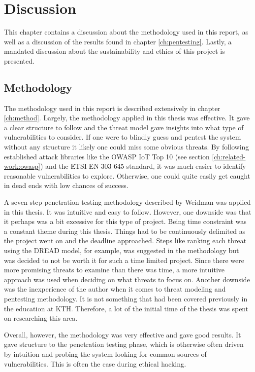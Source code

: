 \chapter{Discussion} \label{ch:discussion}
This chapter contains a discussion about the methodology used in this report, as well as a discussion of the results found in chapter \ref{ch:pentesting}. Lastly, a mandated discussion about the sustainability and ethics of this project is presented.

\section{Methodology}
The methodology used in this report is described extensively in chapter \ref{ch:method}. Largely, the methodology applied in this thesis was effective. It gave a clear structure to follow and the threat model gave insights into what type of vulnerabilities to consider. If one were to blindly guess and pentest the system without any structure it likely one could miss some obvious threats. By following established attack libraries like the OWASP IoT Top 10 \cite{owasp-iot-top10} (see section \ref{ch:related-work:owasp}) and the ETSI EN 303 645 standard, it was much easier to identify reasonable vulnerabilities to explore. Otherwise, one could quite easily get caught in dead ends with low chances of success.

A seven step penetration testing methodology described by Weidman \cite{weidman2014} was applied in this thesis. It was intuitive and easy to follow. However, one downside was that it perhaps was a bit excessive for this type of project. Being time constraint was a constant theme during this thesis. Things had to be continuously delimited as the project went on and the deadline approached. Steps like ranking each threat using the DREAD model, for example, was suggested in the methodology but was decided to not be worth it for such a time limited project. Since there were more promising threats to examine than there was time, a more intuitive approach was used when deciding on what threats to focus on. Another downside was the inexperience of the author when it comes to threat modeling and pentesting methodology. It is not something that had been covered previously in the education at KTH. Therefore, a lot of the initial time of the thesis was spent on researching this area.

Overall, however, the methodology was very effective and gave good results. It gave structure to the penetration testing phase, which is otherwise often driven by intuition and probing the system looking for common sources of vulnerabilities. This is often the case during ethical hacking.

